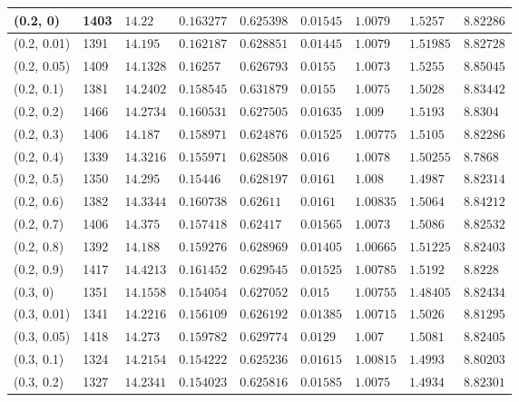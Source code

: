 \begin{center}
{\begin{longtable}{| l | p{} |  p{} | p{} | p{} | p{} | p{} | p{} | p{} |}
 (0.2, 0) & 1403  & $14.22$ & $0.163277$ & $0.625398$ & $0.01545$ & $1.0079$ & $1.5257$ & $8.82286$ \\ \hline
 (0.2, 0.01) & 1391  & $14.195$ & $0.162187$ & $0.628851$ & $0.01445$ & $1.0079$ & $1.51985$ & $8.82728$ \\ \hline
 (0.2, 0.05) & 1409  & $14.1328$ & $0.16257$ & $0.626793$ & $0.0155$ & $1.0073$ & $1.5255$ & $8.85045$ \\ \hline
 (0.2, 0.1) & 1381  & $14.2402$ & $0.158545$ & $0.631879$ & $0.0155$ & $1.0075$ & $1.5028$ & $8.83442$ \\ \hline
 (0.2, 0.2) & 1466  & $14.2734$ & $0.160531$ & $0.627505$ & $0.01635$ & $1.009$ & $1.5193$ & $8.8304$ \\ \hline
 (0.2, 0.3) & 1406  & $14.187$ & $0.158971$ & $0.624876$ & $0.01525$ & $1.00775$ & $1.5105$ & $8.82286$ \\ \hline
 (0.2, 0.4) & 1339  & $14.3216$ & $0.155971$ & $0.628508$ & $0.016$ & $1.0078$ & $1.50255$ & $8.7868$ \\ \hline
 (0.2, 0.5) & 1350  & $14.295$ & $0.15446$ & $0.628197$ & $0.0161$ & $1.008$ & $1.4987$ & $8.82314$ \\ \hline
 (0.2, 0.6) & 1382  & $14.3344$ & $0.160738$ & $0.62611$ & $0.0161$ & $1.00835$ & $1.5064$ & $8.84212$ \\ \hline
 (0.2, 0.7) & 1406  & $14.375$ & $0.157418$ & $0.62417$ & $0.01565$ & $1.0073$ & $1.5086$ & $8.82532$ \\ \hline
 (0.2, 0.8) & 1392  & $14.188$ & $0.159276$ & $0.628969$ & $0.01405$ & $1.00665$ & $1.51225$ & $8.82403$ \\ \hline
 (0.2, 0.9) & 1417  & $14.4213$ & $0.161452$ & $0.629545$ & $0.01525$ & $1.00785$ & $1.5192$ & $8.8228$ \\ \hline
 (0.3, 0) & 1351  & $14.1558$ & $0.154054$ & $0.627052$ & $0.015$ & $1.00755$ & $1.48405$ & $8.82434$ \\ \hline
 (0.3, 0.01) & 1341  & $14.2216$ & $0.156109$ & $0.626192$ & $0.01385$ & $1.00715$ & $1.5026$ & $8.81295$ \\ \hline
 (0.3, 0.05) & 1418  & $14.273$ & $0.159782$ & $0.629774$ & $0.0129$ & $1.007$ & $1.5081$ & $8.82405$ \\ \hline
 (0.3, 0.1) & 1324  & $14.2154$ & $0.154222$ & $0.625236$ & $0.01615$ & $1.00815$ & $1.4993$ & $8.80203$ \\ \hline
 (0.3, 0.2) & 1327  & $14.2341$ & $0.154023$ & $0.625816$ & $0.01585$ & $1.0075$ & $1.4934$ & $8.82301$ \\ \hline

\end{longtable}}
\end{center}
